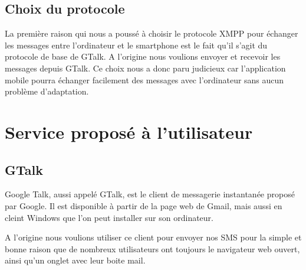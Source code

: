 \subsection{Choix du protocole}

La première raison qui nous a poussé à choisir le protocole XMPP pour échanger les messages entre l'ordinateur et le smartphone est le fait qu'il s'agit du protocole de base de GTalk.
A l'origine nous voulions envoyer et recevoir les messages depuis GTalk.
Ce choix nous a donc paru judicieux car l'application mobile pourra échanger facilement des messages avec l'ordinateur sans aucun problème d'adaptation.
\\






\section{Service proposé à l'utilisateur}
\label{Service proposé à l'utilisateur}


\subsection{GTalk}

Google Talk, aussi appelé GTalk, est le client de messagerie instantanée proposé par Google.
Il est disponible à partir de la page web de Gmail, mais aussi en cleint Windows que l'on peut installer sur son ordinateur.

A l'origine nous voulions utiliser ce client pour envoyer nos SMS pour la simple et bonne raison que de nombreux utilisateurs ont toujours le navigateur web ouvert, ainsi qu'un onglet avec leur boite mail.
\\

